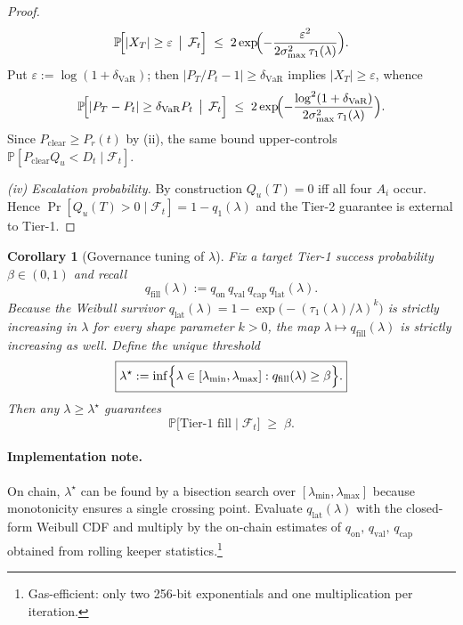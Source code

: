 \documentclass[11pt]{article}
\newtheorem{corollary}[theorem]{Corollary}
\begin{document}
\begin{proof}
      \[
        \mathbb P\!\Bigl[
            |X_T|\ge\varepsilon
            \,\bigm|\,\mathcal F_t
        \Bigr]
        \;\le\;
        2\exp\!\Bigl(
            -\frac{\varepsilon^{2}}
                   {2\sigma_{\max}^{2}\,\tau_1(\lambda)}
        \Bigr).
      \]
      Put \(\varepsilon:=\log(1+\delta_{\mathrm{VaR}})\); then
      \(|P_T/P_t-1|\ge\delta_{\mathrm{VaR}}\)
      implies \(|X_T|\ge\varepsilon\), whence
      \[
        \mathbb P\!\Bigl[
            |P_T-P_t|\ge\delta_{\mathrm{VaR}}P_t
            \,\bigm|\,\mathcal F_t
        \Bigr]
        \;\le\;
        2\exp\!\Bigl(
            -\frac{\log^{2}(1+\delta_{\mathrm{VaR}})}
                   {2\sigma_{\max}^{2}\,\tau_1(\lambda)}
        \Bigr).
      \]
      Since \(P_{\mathrm{clear}}\ge P_r(t)\) by (ii), the same
      bound upper-controls
      \(\mathbb P[P_{\mathrm{clear}}Q_u<D_t\mid\mathcal F_t]\).
      

\smallskip
\noindent
\emph{(iv) Escalation probability.}
By construction
\(Q_u(T)=0\) iff all four $A_i$ occur.
Hence $\Pr[Q_u(T)>0\mid\mathcal F_t]=1-q_1(\lambda)$ and the
Tier-2 guarantee is external to Tier-1.
\end{proof}

\begin{corollary}[Governance tuning of $\lambda$]
\label{cor:tune-lambda}
Fix a target Tier-1 success probability $\beta\!\in\!(0,1)$ and recall
\[
   q_{\mathrm{fill}}(\lambda)
      := q_{\mathrm{on}}\,
         q_{\mathrm{val}}\,
         q_{\mathrm{cap}}\,
         q_{\mathrm{lat}}(\lambda).
\]
Because the Weibull survivor
\(q_{\mathrm{lat}}(\lambda)=1-\exp\!\bigl(-(\tau_1(\lambda)/\lambda)^k\bigr)\)
is \emph{strictly increasing} in $\lambda$ for every shape parameter
$k>0$, the map
\(\lambda\mapsto q_{\mathrm{fill}}(\lambda)\)
is strictly increasing as well.  Define the unique threshold
\[
   \boxed{%
     \lambda^{\star}
       := \inf\Bigl\{
              \lambda\in[\lambda_{\min},\lambda_{\max}]
              : q_{\mathrm{fill}}(\lambda)\ge\beta
            \Bigr\}.
   }
\]
Then any \(\lambda\ge\lambda^{\star}\) guarantees
\[
   \mathbb P\!\bigl[\text{Tier-1 fill}\mid\mathcal F_t\bigr]\;\ge\;\beta.
\]
\end{corollary}

\paragraph{Implementation note.}
On chain, $\lambda^{\star}$ can be found by a bisection search over
\([\lambda_{\min},\lambda_{\max}]\) because monotonicity ensures a
single crossing point.  Evaluate \(q_{\mathrm{lat}}(\lambda)\) with
the closed-form Weibull CDF and multiply by the on-chain estimates of
\(q_{\mathrm{on}},\,q_{\mathrm{val}},\,q_{\mathrm{cap}}\) obtained from
rolling keeper statistics.\footnote{Gas-efficient: only two 256-bit
exponentials and one multiplication per iteration.}
\end{document}

